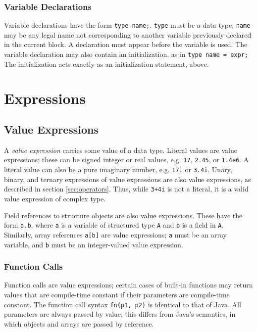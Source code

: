 \documentclass[11pt]{article}
\begin{document}
\subsubsection{Variable Declarations}

Variable declarations have the form \lstinline|type name;|.  \lstinline|type|
must be a data type; \lstinline|name| may be any legal name not
corresponding to another variable previously declared in the current
block.  A declaration must appear before the variable is used.  The
variable declaration may also contain an initialization, as in
\lstinline|type name = expr;|  The initialization acts exactly as an
initialization statement, above.


\section{Expressions}

\subsection{Value Expressions}
\label{sec:expr-value}

A \emph{value expression} carries some value of a data type.  Literal
values are value expressions; these can be signed integer or real
values, e.g. \lstinline|17|, \lstinline|2.45|, or \lstinline|1.4e6|.  A literal value
can also be a pure imaginary number, e.g. \lstinline|17i| or \lstinline|3.4i|.
Unary, binary, and ternary expressions of value expressions are also
value expressions, as described in section \ref{sec:operators}.  Thus,
while \lstinline|3+4i| is not a literal, it is a valid value expression of
complex type.

Field references to structure objects are also value expressions.
These have the form \lstinline|a.b|, where \lstinline|a| is a variable of
structured type \lstinline|A| and \lstinline|b| is a field in \lstinline|A|.
Similarly, array references \lstinline|a[b]| are value expressions;
\lstinline|a| must be an array variable, and \lstinline|b| must be an
integer-valued value expression.

\subsubsection{Function Calls}
\label{sec:expr-funcall}

Function calls are value expressions; certain cases of built-in
functions may return values that are compile-time constant if their
parameters are compile-time constant.  The function call syntax
\lstinline|fn(p1, p2)| is identical to that of Java.  All parameters are
always passed by value; this differs from Java's semantics, in which
objects and arrays are passed by reference.
\end{document}
